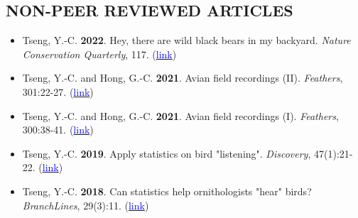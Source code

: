 \documentclass[11pt,letterpaper,sans]{moderncv}        %
\begin{document}
\subsection{NON-PEER REVIEWED ARTICLES}
\begin{itemize}

\item{Tseng, Y.-C. \textbf{2022}. Hey, there are wild black bears in my backyard. \textit{Nature Conservation Quarterly}}, 117. (\href{https://www.tesri.gov.tw/Uploads/userfile/A15_1/2022-03-31_1337084121.pdf#page=41}{\textcolor{blue}{link}})
\vspace{3pt}

\item{Tseng, Y.-C. and Hong, G.-C. \textbf{2021}. Avian field recordings (II). \textit{Feathers}}, 301:22-27. (\href{https://www.bird.org.tw/feather}{\textcolor{blue}{link}})
\vspace{3pt}

\item{Tseng, Y.-C. and Hong, G.-C. \textbf{2021}. Avian field recordings (I). \textit{Feathers}}, 300:38-41. (\href{https://www.bird.org.tw/feather}{\textcolor{blue}{link}})
\vspace{3pt}

\item{Tseng, Y.-C. \textbf{2019}. Apply statistics on bird "listening". \textit{Discovery}}, 47(1):21-22. (\href{https://drive.google.com/open?id=1lZC8H246lFH-XCGI6vtBjXMIq1YqukUG}{\textcolor{blue}{link}})
\vspace{3pt}

\item{Tseng, Y.-C. \textbf{2018}. Can statistics help ornithologists "hear" birds? \textit{BranchLines}}, 29(3):11. (\href{https://forestry.ubc.ca/files/2019/04/bl-29.3.pdf#page=11}{\textcolor{blue}{link}}) 
\vspace{3pt}

\end{itemize}

\end{document}
